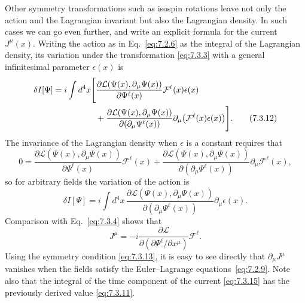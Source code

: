 Other symmetry transformations such as isospin rotations leave not only the
action and the Lagrangian invariant but also the Lagrangian density. In such
cases we can go even further, and write an explicit formula for the current
$J^\mu(x)$. Writing the action as in Eq.~\eqref{eq:7.2.6} as the integral of the
Lagrangian density, its variation under the transformation \eqref{eq:7.3.3} with a
general infinitesimal parameter $\epsilon(x)$ is
\begin{align}
\delta I[\Psi]=i\int d^4x\Bigg[&
\frac{\partial\mathcal{L}(\Psi(x),\partial_\mu\Psi(x))}
{\partial\Psi^\ell(x)}\mathcal{F}^\ell(x)\epsilon(x)\notag\\
&+\frac{\partial\mathcal{L}(\Psi(x),\partial_\mu\Psi(x))}
{\partial(\partial_\mu\Psi^\ell(x))}
\partial_\mu\bigl(\mathcal{F}^\ell(x)\epsilon(x)\bigr)\Bigg].
\tag{7.3.12}\label{eq:7.3.12}
\end{align}
The invariance of the Lagrangian density when $\epsilon$ is a constant requires
that
\begin{equation}
0=\frac{\partial\mathcal{L}(\Psi(x),\partial_\mu\Psi(x))}
{\partial\Psi^\ell(x)}\mathcal{F}^\ell(x)
+\frac{\partial\mathcal{L}(\Psi(x),\partial_\mu\Psi(x))}
{\partial(\partial_\mu\Psi^\ell(x))}\partial_\mu\mathcal{F}^\ell(x),
\tag{7.3.13}\label{eq:7.3.13}
\end{equation}
so for arbitrary fields the variation of the action is
\begin{equation}
\delta I[\Psi]=i\int d^4x\,
\frac{\partial\mathcal{L}(\Psi(x),\partial_\mu\Psi(x))}
{\partial(\partial_\mu\Psi^\ell(x))}
\partial_\mu\epsilon(x).
\tag{7.3.14}\label{eq:7.3.14}
\end{equation}
Comparison with Eq.~\eqref{eq:7.3.4} shows that
\begin{equation}
J^\mu=-i\frac{\partial\mathcal{L}}
{\partial(\partial\Psi^\ell/\partial x^\mu)}\mathcal{F}^\ell.
\tag{7.3.15}\label{eq:7.3.15}
\end{equation}
Using the symmetry condition \eqref{eq:7.3.13}, it is easy to see directly that
$\partial_\mu J^\mu$ vanishes when the fields satisfy the Euler--Lagrange
equations~\eqref{eq:7.2.9}. Note also that the integral of the time component of the
current \eqref{eq:7.3.15} has the previously derived value \eqref{eq:7.3.11}.

